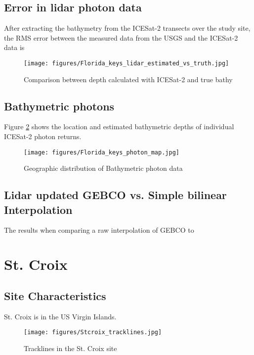 \subsection{Error in lidar photon data}
After extracting the bathymetry from the ICESat-2 transects over the study site, the RMS error between the measured data from the USGS and the ICESat-2 data is
\begin{figure}[h]
    \centering
    \texttt{[image: figures/Florida\_keys\_lidar\_estimated\_vs\_truth.jpg]}
    \caption{Comparison between depth calculated with ICESat-2 and true bathy}
    \label{fig:fl_truth_vs_measured_points}
\end{figure}
% 

% 

\subsection{Bathymetric photons}
Figure \ref{fig:bathyphotonmap} shows the location and estimated bathymetric depths of individual ICESat-2 photon returns.
\begin{figure}[h]
    \centering
    \texttt{[image: figures/Florida\_keys\_photon\_map.jpg]}
    \caption{Geographic distribution of Bathymetric photon data}
    \label{fig:bathyphotonmap}
\end{figure}

\subsection{Lidar updated GEBCO vs. Simple bilinear Interpolation}
The results when comparing a raw interpolation of GEBCO to
% 



\section{St. Croix}

\subsection{Site Characteristics}

St. Croix is in the US Virgin Islands. 

\begin{figure}[h]
    \centering
    \texttt{[image: figures/Stcroix\_tracklines.jpg]}
    \caption{Tracklines in the St. Croix site}
    \label{fig:st-croix-tracklines}
\end{figure}

